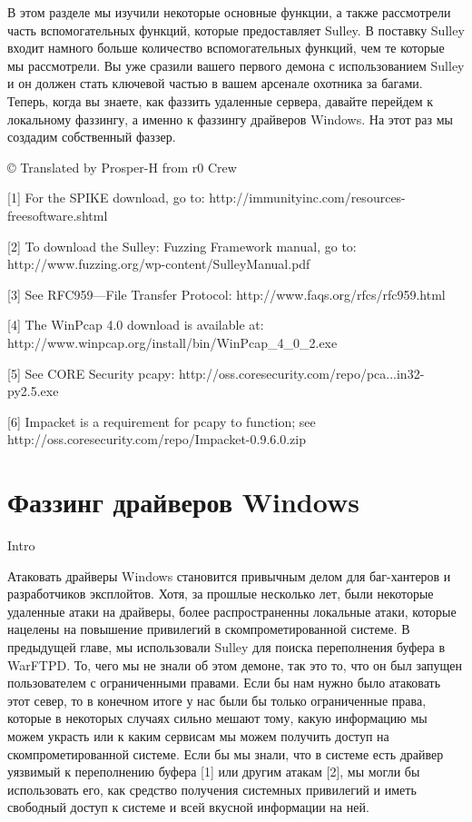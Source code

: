 \documentclass[12pt, a4paper, oneside]{book}
\begin{document}
В этом разделе мы изучили некоторые основные функции, а также рассмотрели часть вспомогательных функций, которые предоставляет Sulley. В поставку Sulley входит намного больше количество вспомогательных функций, чем те которые мы рассмотрели. Вы уже сразили вашего первого демона с использованием Sulley и он должен стать ключевой частью в вашем арсенале охотника за багами. Теперь, когда вы знаете, как фаззить удаленные сервера, давайте перейдем к локальному фаззингу, а именно к фаззингу драйверов Windows. На этот раз мы создадим собственный фаззер. 


© Translated by Prosper-H from r0 Crew


[1] For the SPIKE download, go to:
http://immunityinc.com/resources-freesoftware.shtml

[2] To download the Sulley: Fuzzing Framework manual, go to: http://www.fuzzing.org/wp-content/SulleyManual.pdf

[3] See RFC959—File Transfer Protocol: 
http://www.faqs.org/rfcs/rfc959.html

[4] The WinPcap 4.0 download is available at: http://www.winpcap.org/install/bin/WinPcap\_4\_0\_2.exe

[5] See CORE Security pcapy:
http://oss.coresecurity.com/repo/pca...in32-py2.5.exe

[6] Impacket is a requirement for pcapy to function; see http://oss.coresecurity.com/repo/Impacket-0.9.6.0.zip

\chapter{Фаззинг драйверов Windows}
Intro

Атаковать драйверы Windows становится привычным делом для баг-хантеров и разработчиков эксплойтов. Хотя, за прошлые несколько лет, были некоторые удаленные атаки на драйверы, более распространенны локальные атаки, которые нацелены на повышение привилегий в скомпрометированной системе. В предыдущей главе, мы использовали Sulley для поиска переполнения буфера в WarFTPD. То, чего мы не знали об этом демоне, так это то, что он был запущен пользователем с ограниченными правами. Если бы нам нужно было атаковать этот север, то в конечном итоге у нас были бы только ограниченные права, которые в некоторых случаях сильно мешают тому, какую информацию мы можем украсть или к каким сервисам мы можем получить доступ на скомпрометированной системе. Если бы мы знали, что в системе есть драйвер уязвимый к переполнению буфера [1] или другим атакам [2], мы могли бы использовать его, как средство получения системных привилегий и иметь свободный доступ к системе и всей вкусной информации на ней.
\end{document}
